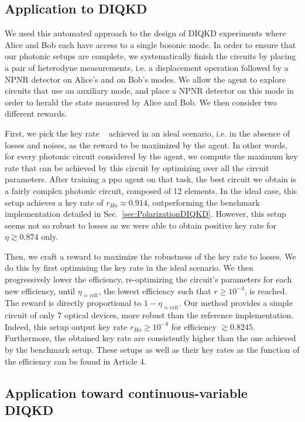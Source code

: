 \subsection{Application to DIQKD}
\label{sec:new_design}

We used this automated approach to the design of DIQKD experiments where Alice and Bob each have access to a single bosonic mode. 
In order to ensure that our photonic setups are complete, we systematically finish the circuits by placing a pair of heterodyne measurements, i.e. a displacement operation followed by a NPNR detector on Alice's and on Bob's modes. 
We allow the agent to explore circuits that use an auxiliary mode, and place a NPNR detector on this mode in order to herald the state measured by Alice and Bob. 
We then consider two different rewards.

First, we pick the key rate ~ achieved in an ideal scenario, i.e. in the absence of losses and noises, as the reward to be maximized by the agent. 
In other words, for every photonic circuit considered by the agent, we compute the maximum key rate that can be achieved by this circuit by optimizing over all the circuit parameters.
After training a \acrshort{ppo} agent on that task, the best circuit we obtain is a fairly complex photonic circuit, composed of 12 elements.
In the ideal case, this setup achieves a key rate of $r_{Ho}\approx 0.914$, outperforming the benchmark implementation detailed in Sec.~\ref{sec:PolarizationDIQKD}.
However, this setup seems not so robust to losses as we were able to obtain positive key rate for $\eta \apprge 0.874$ only.

Then, we craft a reward to maximize the robustness of the key rate to losses.
We do this by first optimising the key rate in the ideal scenario.
We then progressively lower the efficiency, re-optimizing the circuit's parameters for each new efficiency, until $\eta_{\approx\mathrm{crit}}$, the lowest efficiency such that $r \geq 10^{-4}$, is reached.
The reward is directly proportional to $1-\eta_{\approx \mathrm{crit}}$.
Our method provides a simple circuit of only 7 optical devices, more robust than the reference implementation.
Indeed, this setup output key rate $r_{Ho}\geq10^{-8}$ for efficiency $\apprge 0.8245$. 
Furthermore, the obtained key rate are consistently higher than the one achieved by the benchmark setup.
These setups as well as their key rates as the function of the efficiency can be found in Article 4.


\subsection{Application toward continuous-variable DIQKD}
\label{sec:homodyne}

